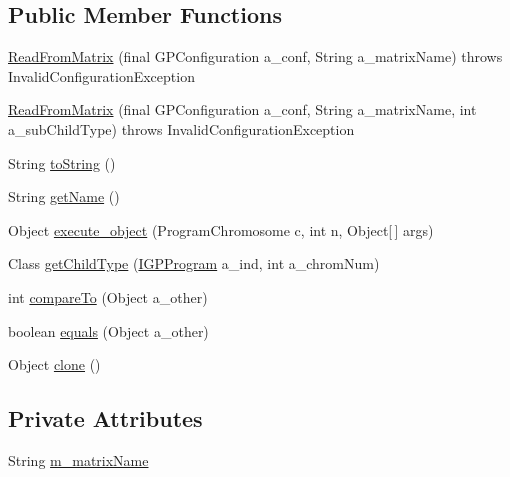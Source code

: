 \subsection*{Public Member Functions}
\begin{DoxyCompactItemize}
\item 
\hyperlink{classorg_1_1jgap_1_1gp_1_1function_1_1_read_from_matrix_a5877eb30299f441fb6c074cdd1d68d8c}{Read\-From\-Matrix} (final G\-P\-Configuration a\-\_\-conf, String a\-\_\-matrix\-Name)  throws Invalid\-Configuration\-Exception 
\item 
\hyperlink{classorg_1_1jgap_1_1gp_1_1function_1_1_read_from_matrix_a5caf04215223c83bd2ca45241f637790}{Read\-From\-Matrix} (final G\-P\-Configuration a\-\_\-conf, String a\-\_\-matrix\-Name, int a\-\_\-sub\-Child\-Type)  throws Invalid\-Configuration\-Exception 
\item 
String \hyperlink{classorg_1_1jgap_1_1gp_1_1function_1_1_read_from_matrix_a7642f0c2b0186f96117277c060604d0e}{to\-String} ()
\item 
String \hyperlink{classorg_1_1jgap_1_1gp_1_1function_1_1_read_from_matrix_a4ccfb3a9a8909a32be657a4a8058af37}{get\-Name} ()
\item 
Object \hyperlink{classorg_1_1jgap_1_1gp_1_1function_1_1_read_from_matrix_afdb917894c060c258f4f4572f36f1753}{execute\-\_\-object} (Program\-Chromosome c, int n, Object\mbox{[}$\,$\mbox{]} args)
\item 
Class \hyperlink{classorg_1_1jgap_1_1gp_1_1function_1_1_read_from_matrix_aae5803c4bc1ad56cd6a8a126bcc8cf98}{get\-Child\-Type} (\hyperlink{interfaceorg_1_1jgap_1_1gp_1_1_i_g_p_program}{I\-G\-P\-Program} a\-\_\-ind, int a\-\_\-chrom\-Num)
\item 
int \hyperlink{classorg_1_1jgap_1_1gp_1_1function_1_1_read_from_matrix_aea2a53c3c2219d4d681b3e231fc6a28a}{compare\-To} (Object a\-\_\-other)
\item 
boolean \hyperlink{classorg_1_1jgap_1_1gp_1_1function_1_1_read_from_matrix_aca56d8d40b98085f48e455f252d27873}{equals} (Object a\-\_\-other)
\item 
Object \hyperlink{classorg_1_1jgap_1_1gp_1_1function_1_1_read_from_matrix_ad873dd8f38d0fe3f18b7b0c9bf4c70c5}{clone} ()
\end{DoxyCompactItemize}
\subsection*{Private Attributes}
\begin{DoxyCompactItemize}
\item 
String \hyperlink{classorg_1_1jgap_1_1gp_1_1function_1_1_read_from_matrix_abacaacfd019adde69b64400ca3d35e39}{m\-\_\-matrix\-Name}
\end{DoxyCompactItemize}
